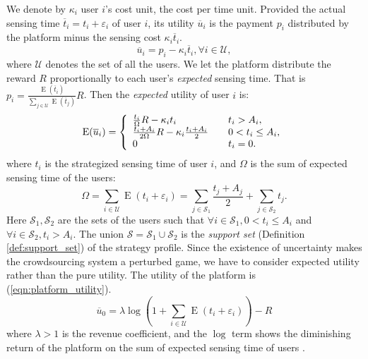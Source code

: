 \documentclass{IEEEtran}
\begin{document}
We denote by $\kappa_i$ user $i$\rq{}s cost unit, the cost per time unit. Provided the actual sensing time $\overline{t}_i=t_i+\varepsilon_i$ of user $i$, its utility $\overline{u}_i$ is the payment $p_i$ distributed by the platform minus the sensing cost $\kappa_i\overline{t}_i$.
\begin{equation}
\overline{u}_i=p_i-\kappa_i\overline{t}_i,\forall i\in\mathcal{U},
\end{equation}
where $\mathcal{U}$ denotes the set of all the users. We let the platform distribute the reward $R$ proportionally to each user\rq{}s \emph{expected} sensing time. That is $p_i=\frac{\operatorname{E}(\overline{t}_i)}{\sum_{j\in\mathcal{U}}{\operatorname{E}(\overline{t}_j)}}R$. Then the \emph{expected} utility of user $i$ is:
\begin{equation}
\label{eqn:expected_user_utility}
\operatorname{E}(\overline{u}_i)=\left\{
\begin{array}{l l}
\frac{t_i}{\Omega}R-\kappa_it_i & \quad \text{$t_i> A_i$,}\\
\frac{t_i+A_i}{2\Omega}R-\kappa_i\frac{t_i+A_i}{2} & \quad \text{$0<t_i\leq A_i$,}\\
0 & \quad \text{$t_i=0$.}
\end{array} \right.
\end{equation}
where $t_i$ is the strategized sensing time of user $i$, and $\Omega$ is the sum of expected sensing time of the users:
\begin{equation}
\label{eqn:omega}
\Omega = \sum_{i\in\mathcal{U}}\operatorname{E}(t_i+\varepsilon_i) = \sum_{j\in \mathcal{S}_1}\frac{t_j+A_j}{2}+\sum_{j\in \mathcal{S}_2}t_j.
\end{equation}
Here $\mathcal{S}_1,\mathcal{S}_2$ are the sets of the users such that $\forall i\in\mathcal{S}_1,0<t_i\leq A_i$ and $\forall i\in\mathcal{S}_2,t_i> A_i$. The union $\mathcal{S}=\mathcal{S}_1\cup\mathcal{S}_2$ is the \emph{support set} (Definition \ref{def:support_set}) of the strategy profile. Since the existence of uncertainty makes the crowdsourcing system a perturbed game, we have to consider expected utility rather than the pure utility. The utility of the platform is (\ref{eqn:platform_utility}).
\begin{equation}
\label{eqn:platform_utility}
\overline{u}_0=\lambda \log{(1+\sum_{i\in\mathcal{U}}\operatorname{E}(t_i+\varepsilon_i))}-R
\end{equation}
where $\lambda > 1$ is the revenue coefficient, and the $\log$ term shows the diminishing return of the platform on the sum of expected sensing time of users {\color{black}\cite{yang:crowdsourcing}}.
\end{document}
